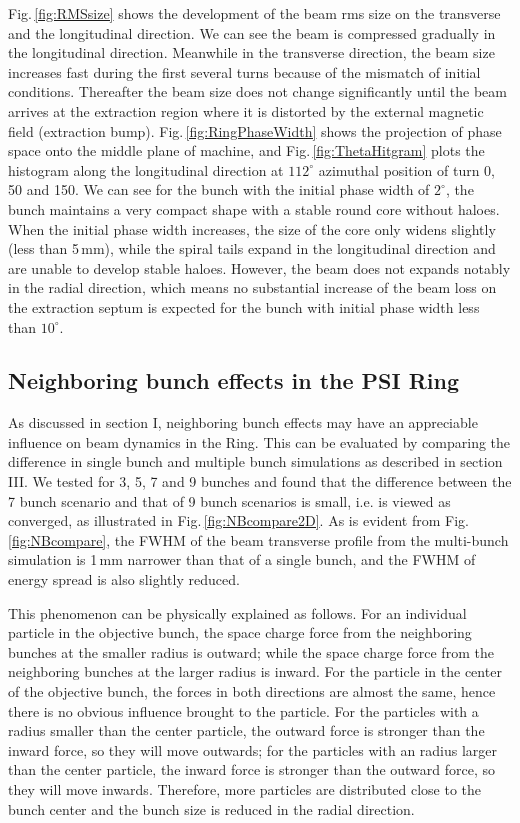 \documentclass[aps,prstab,twocolumn,superscriptaddress,showpacs]{revtex4}
\begin{document}
Fig.\,\ref{fig:RMSsize} shows the development of the beam rms size on the transverse and the longitudinal direction. We can see the beam is compressed
gradually in the longitudinal direction. Meanwhile in the transverse direction, the beam size increases fast during the first several turns 
because of the mismatch of initial conditions. Thereafter the beam size  does not change significantly until the beam arrives at the extraction region 
where it is distorted by the external magnetic field (extraction bump).
Fig.\,\ref{fig:RingPhaseWidth} shows the projection of phase space onto the middle plane of machine, and 
Fig.\,\ref{fig:ThetaHitgram} plots the histogram along the longitudinal direction at $112^\circ$ azimuthal position of turn 0, 50 and 150.
We can see for the bunch with the initial phase width of $2^\circ$, the bunch maintains a very compact shape with a stable round core without haloes. 
When the initial phase width increases, the size of the core only widens slightly (less than 5\,mm), while the spiral tails expand in the longitudinal direction and 
are unable to develop stable haloes. However, the beam does not expands notably in the radial direction, which means no substantial increase of the beam loss 
on the extraction septum is expected for the bunch with initial phase width less than $10^\circ$.

\subsection {Neighboring bunch effects in the PSI Ring}

As discussed in section I, neighboring bunch effects may have an appreciable influence on beam dynamics in the Ring. This can be evaluated by comparing the difference in single bunch and multiple bunch simulations as 
described in section III. We tested for 3, 5, 7 and 9 bunches and found that 
the difference between the 7 bunch scenario and that of 9 bunch scenarios is small, i.e. is viewed as converged,  as illustrated in Fig.\,\ref{fig:NBcompare2D}. 
As is evident from Fig.\,\ref{fig:NBcompare}, the FWHM of the beam transverse profile from the multi-bunch simulation is 1\,mm narrower than that of a single bunch, and the FWHM of energy spread is also slightly reduced. 

This phenomenon can be physically explained as follows. For an individual particle in the objective bunch, the space charge force from the neighboring bunches at the smaller radius is outward;
while the space charge force from the neighboring bunches at the larger radius is inward. For the particle in the center of the objective bunch, 
the forces in both directions are almost the same, hence there is no obvious influence brought to the particle. For the particles with a radius smaller than the center particle, 
the outward force is stronger than the inward force, so they will move outwards; for the particles with an radius larger than the center particle, 
the inward force is stronger than the outward force, so they will move inwards. Therefore,
more particles are distributed close to the bunch center and the bunch size is reduced in the radial direction.
\end{document}
